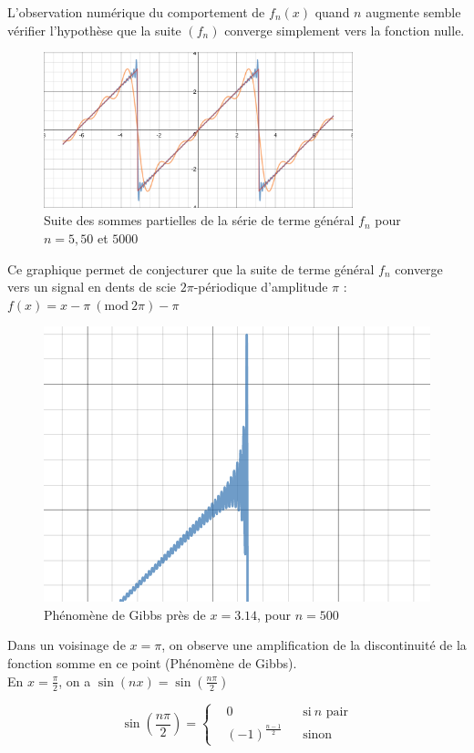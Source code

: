 \documentclass{article}
\newcommand{\Mod}[1]{\ (\mathrm{mod}\ #1)}
\begin{document}
L'observation numérique du comportement de $f_n(x)$ quand $n$ augmente semble vérifier l'hypothèse que
la suite $(f_n)$ converge simplement vers la fonction nulle.

\newpage

\begin{figure}[ht!]
    \centering
    \includegraphics[width=0.8\textwidth]{figures/S_n.png}
    \caption{Suite des sommes partielles de la série de terme général $f_n$ pour $n = 5, 50$ et $5000$}
\end{figure}

Ce graphique permet de conjecturer que la suite de terme général $f_n$ converge vers un signal en dents de scie
$2\pi$-{périodique} d'amplitude $\pi$ : $f(x) = x - \pi \Mod{2\pi} - \pi$

\begin{figure}[ht!]
    \centering
    \includegraphics[height=0.35\textwidth]{figures/gibbs.png}
    \caption{Phénomène de Gibbs près de $x = 3.14$, pour $n = 500$}
\end{figure}

Dans un voisinage de $x = \pi$, on observe une amplification de la discontinuité de la fonction somme en ce point
(Phénomène de Gibbs). \\

En $x = \frac{\pi}{2}$, on a $\sin(nx) = \sin(\frac{n\pi}{2})$

\begin{equation*}
    \sin(\frac{n\pi}{2}) = \left \{
    \begin{aligned}
      &0 && \text{si}\ n \text{ pair} \\
      &(-1)^{\frac{n - 1}{2}} && \text{sinon}
    \end{aligned} \right.
\end{equation*} 
\end{document}
